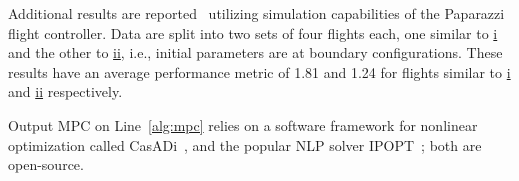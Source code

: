 \documentclass[letterpaper,10pt,conference,twoside]{IEEEtran}
\newcommand{\stt}[1]{{\small\tt #1}} %
\newcommand{\powprof}{\stt{powprofiler}}
\theoremstyle{definition}
\begin{document}
{\color{black}
Additional results are reported~\cite{seewaldphdthesis} utilizing simulation capabilities of the Paparazzi flight controller. Data are split into two sets of four flights each, one similar to \hyperref[fig:trajs-dyn-i]{i} and the other to \hyperref[fig:trajs-dyn-ii]{ii}, i.e., initial parameters are at boundary configurations.
These results have an average performance metric of 1.81 and 1.24 for flights similar to \hyperref[fig:trajs-dyn-i]{i} and \hyperref[fig:trajs-dyn-i]{ii} respectively.}

Output MPC on Line~\ref{alg:mpc} relies on a software framework for nonlinear optimization called CasADi~\cite{andersson2012casadi%
}, and the popular NLP solver IPOPT~\cite{wachter2006implementation}; both are open-source.



\end{document}
